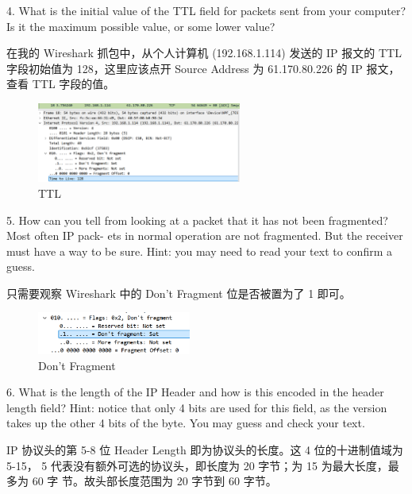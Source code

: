\documentclass[14pt,a4paper,UTF8,twoside]{article}
\begin{document}
\vspace{0.5cm}

4. What is the initial value of the TTL field for packets sent from your computer? Is it the 
maximum possible value, or some lower value?

在我的 Wireshark 抓包中，从个人计算机 (192.168.1.114) 发送的 IP 报文的 TTL 字段初始值为 128，这里应该点开 Source Address 为 61.170.80.226 的 IP 报文，查看 TTL 字段的值。

\begin{figure}[H]
  \centering
  \includegraphics[width=0.6\textwidth]{lab3/ttl.png}
  \caption{TTL}
\end{figure}

\vspace{0.5cm}

5. How can you tell from looking at a packet that it has not been fragmented? Most often IP 
pack- ets in normal operation are not fragmented. But the receiver must have a way to be sure. 
Hint: you may need to read your text to confirm a guess.

只需要观察 Wireshark 中的 Don't Fragment 位是否被置为了 1 即可。

\begin{figure}[H]
\centering
  \includegraphics[width=0.45\textwidth]{lab3/fragment.png}
  \caption{Don't Fragment}
\end{figure}

\vspace{0.5cm}

6. What is the length of the IP Header and how is this encoded in the header length field? Hint:
notice that only 4 bits are used for this field, as the version takes up the other 4 bits of the 
byte. You may guess and check your text.

IP 协议头的第 5-8 位 Header Length 即为协议头的长度。这 4 位的十进制值域为 5-15，
5 代表没有额外可选的协议头，即长度为 20 字节；为 15 为最大长度，最多为 60 字
节。故头部长度范围为 20 字节到 60 字节。
\end{document}
